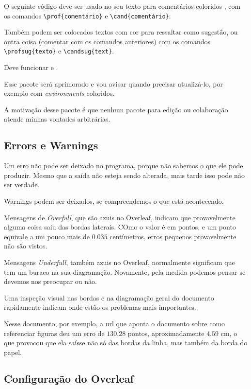 \documentclass{article}
\begin{document}
O seguinte código deve ser usado no seu texto para comentários coloridos , com os comandos \verb!\prof{comentário}! e \verb!\cand{comentário}!:

Também podem ser colocados textos com cor para ressaltar como sugestão, ou outra coisa (comentar com os comandos anteriores) com os comandos \verb!\profsug{texto}! e
\verb!\candsug{text}!.

Deve funcionar  e .

Esse pacote será aprimorado e vou avisar quando precisar atualizá-lo, por exemplo com \textit{environments} coloridos.

A motivação desse pacote é que nenhum pacote para edição ou colaboração atende minhas vontades arbitrárias.

\subsection{Errors e Warnings}

Um erro não pode ser deixado no programa, porque não sabemos o que ele pode produzir. Mesmo que a saída não esteja sendo alterada, mais tarde isso pode não ser verdade.

Warnings podem ser deixados, se compreendemos o que está acontecendo.

Mensagens de \textit{Overfull}, que são azuis no Overleaf, indicam que provavelmente alguma coisa saiu das bordas laterais. COmo o valor é em pontos, e um ponto equivale a um pouco mais de  $0.035$ centímetros, erros pequenos provavelmente não são vistos.

Mensagens \textit{Underfull}, também azuis no Overleaf, normalmente significam que tem um buraco na sua diagramação. Novamente, pela medida podemos pensar se devemos nos preocupar ou não.

Uma inspeção visual nas bordas e na diagramação geral do documento rapidamente indicam onde estão os problemas mais importantes.

Nesse documento, por exemplo, a url que aponta o documento sobre como referenciar figuras deu um erro de $130.28$ pontos, aproximadamente $4.59$ cm, o que provocou que ela saísse não só das bordas da linha, mas também da borda do papel.

\subsection{Configuração do Overleaf}    
    
\end{document}
